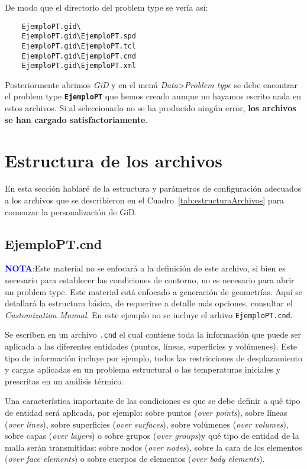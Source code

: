 \documentclass[10pt, a4paper, twocolumn]{article} %
\begin{document}
De modo que el directorio del problem type se vería así:

\begin{verbatim}
	EjemploPT.gid\
	EjemploPT.gid\EjemploPT.spd
	EjemploPT.gid\EjemploPT.tcl
	EjemploPT.gid\EjemploPT.cnd
	EjemploPT.gid\EjemploPT.xml
\end{verbatim}

Posteriormente abrimos \textit{GiD} y en el menú \textit{Data}>\textit{Problem type} se debe encontrar el problem type \textbf{\texttt{EjemploPT}} que hemos creado aunque no hayamos escrito nada en estos archivos. Si al seleccionarlo no se ha producido ningún error, \textbf{los archivos se han cargado satisfactoriamente}.

\section{Estructura de los archivos}

En esta sección hablaré de la estructura y parámetros de configuración adecuados a los archivos que se describieron en el Cuadro~\ref{tab:estructuraArchivos} para comenzar la personalización de GiD.

\subsection{EjemploPT.cnd}

\textcolor{blue}{\textbf{NOTA}:}Este material no se enfocará a la definición de este archivo, si bien es necesario para establecer las condiciones de contorno, no es necesario para abrir un problem type. Este material está enfocado a generación de geometrías. Aquí se detallará la estructura básica, de requerirse a detalle más opciones, consultar el \textit{Customization Manual}. En este ejemplo no se incluye el arhivo \texttt{EjemploPT.cnd}.

Se escriben en un archivo \texttt{.cnd} el cual contiene toda la información que puede ser aplicada a las diferentes entidades (puntos, líneas, superficies y volúmenes). Este tipo de información incluye por ejemplo, todos las restricciones de desplazamiento y cargas aplicadas en un problema estructural o las temperaturas iniciales y prescritas en un análisis térmico.

Una característica importante de las condiciones es que se debe definir a qué tipo de entidad será aplicada, por ejemplo: sobre puntos (\textit{over points}), sobre líneas (\textit{over lines}), sobre superficies (\textit{over surfaces}), sobre volúmenes (\textit{over volumes}), sobre capas (\textit{over layers}) o sobre grupos (\textit{over groups})y qué tipo de entidad de la malla serán transmitidas: sobre nodos (\textit{over nodes}), sobre la cara de los elementos (\textit{over face elements}) o sobre cuerpos de elementos (\textit{over body elements}).
\end{document}
